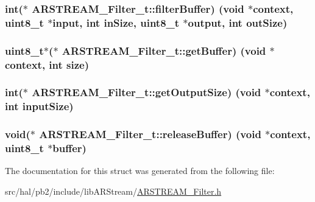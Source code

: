 \subsubsection[{\texorpdfstring{filter\+Buffer}{filterBuffer}}]{\setlength{\rightskip}{0pt plus 5cm}int($\ast$ A\+R\+S\+T\+R\+E\+A\+M\+\_\+\+Filter\+\_\+t\+::filter\+Buffer) (void $\ast${\bf context}, uint8\+\_\+t $\ast$input, int in\+Size, uint8\+\_\+t $\ast$output, int out\+Size)}\hypertarget{struct_a_r_s_t_r_e_a_m___filter__t_afffa4052478ed0e26779d7a09dc8ea40}{}\label{struct_a_r_s_t_r_e_a_m___filter__t_afffa4052478ed0e26779d7a09dc8ea40}
\subsubsection[{\texorpdfstring{get\+Buffer}{getBuffer}}]{\setlength{\rightskip}{0pt plus 5cm}uint8\+\_\+t$\ast$($\ast$ A\+R\+S\+T\+R\+E\+A\+M\+\_\+\+Filter\+\_\+t\+::get\+Buffer) (void $\ast${\bf context}, int size)}\hypertarget{struct_a_r_s_t_r_e_a_m___filter__t_aa291d468bba578e3074c5ea474146333}{}\label{struct_a_r_s_t_r_e_a_m___filter__t_aa291d468bba578e3074c5ea474146333}
\subsubsection[{\texorpdfstring{get\+Output\+Size}{getOutputSize}}]{\setlength{\rightskip}{0pt plus 5cm}int($\ast$ A\+R\+S\+T\+R\+E\+A\+M\+\_\+\+Filter\+\_\+t\+::get\+Output\+Size) (void $\ast${\bf context}, int input\+Size)}\hypertarget{struct_a_r_s_t_r_e_a_m___filter__t_a24e4b1dac2aeb18d6b316700982d4c2d}{}\label{struct_a_r_s_t_r_e_a_m___filter__t_a24e4b1dac2aeb18d6b316700982d4c2d}
\subsubsection[{\texorpdfstring{release\+Buffer}{releaseBuffer}}]{\setlength{\rightskip}{0pt plus 5cm}void($\ast$ A\+R\+S\+T\+R\+E\+A\+M\+\_\+\+Filter\+\_\+t\+::release\+Buffer) (void $\ast${\bf context}, uint8\+\_\+t $\ast$buffer)}\hypertarget{struct_a_r_s_t_r_e_a_m___filter__t_affb86c1dbfd31a66ef601c1b4e0fcbe4}{}\label{struct_a_r_s_t_r_e_a_m___filter__t_affb86c1dbfd31a66ef601c1b4e0fcbe4}


The documentation for this struct was generated from the following file\+:\begin{DoxyCompactItemize}
\item 
src/hal/pb2/include/lib\+A\+R\+Stream/\hyperlink{_a_r_s_t_r_e_a_m___filter_8h}{A\+R\+S\+T\+R\+E\+A\+M\+\_\+\+Filter.\+h}\end{DoxyCompactItemize}
